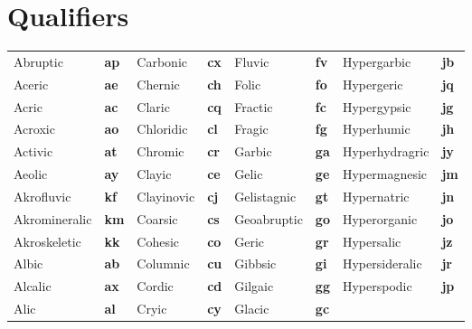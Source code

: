 \documentclass[
  letterpaper,
  DIV=11,
  numbers=noendperiod]{scrreprt}
\begin{document}
\hypertarget{qualifiers}{%
\section{Qualifiers}\label{qualifiers}}

\begin{longtable}[]{@{}
  >{\raggedright\arraybackslash}p{}
  >{\raggedright\arraybackslash}p{}
  >{\raggedright\arraybackslash}p{}
  >{\raggedright\arraybackslash}p{}
  >{\raggedright\arraybackslash}p{}
  >{\raggedright\arraybackslash}p{}
  >{\raggedright\arraybackslash}p{}
  >{\raggedright\arraybackslash}p{}@{}}
\toprule()
\endhead
Abruptic & \textbf{ap} & Carbonic & \textbf{cx} & Fluvic & \textbf{fv} &
Hypergarbic & \textbf{jb} \\
Aceric & \textbf{ae} & Chernic & \textbf{ch} & Folic & \textbf{fo} &
Hypergeric & \textbf{jq} \\
Acric & \textbf{ac} & Claric & \textbf{cq} & Fractic & \textbf{fc} &
Hypergypsic & \textbf{jg} \\
Acroxic & \textbf{ao} & Chloridic & \textbf{cl} & Fragic & \textbf{fg} &
Hyperhumic & \textbf{jh} \\
Activic & \textbf{at} & Chromic & \textbf{cr} & Garbic & \textbf{ga} &
Hyperhydragric & \textbf{jy} \\
Aeolic & \textbf{ay} & Clayic & \textbf{ce} & Gelic & \textbf{ge} &
Hypermagnesic & \textbf{jm} \\
Akrofluvic & \textbf{kf} & Clayinovic & \textbf{cj} & Gelistagnic &
\textbf{gt} & Hypernatric & \textbf{jn} \\
Akromineralic & \textbf{km} & Coarsic & \textbf{cs} & Geoabruptic &
\textbf{go} & Hyperorganic & \textbf{jo} \\
Akroskeletic & \textbf{kk} & Cohesic & \textbf{co} & Geric & \textbf{gr}
& Hypersalic & \textbf{jz} \\
Albic & \textbf{ab} & Columnic & \textbf{cu} & Gibbsic & \textbf{gi} &
Hypersideralic & \textbf{jr} \\
Alcalic & \textbf{ax} & Cordic & \textbf{cd} & Gilgaic & \textbf{gg} &
Hyperspodic & \textbf{jp} \\
Alic & \textbf{al} & Cryic & \textbf{cy} & Glacic & \textbf{gc} &

\end{longtable}
\end{document}
